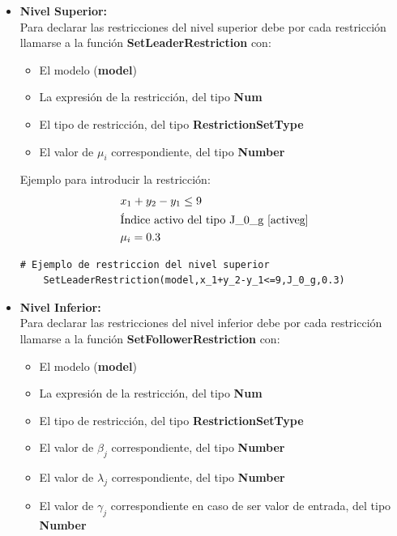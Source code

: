 \begin{itemize}
    \item \textbf{Nivel Superior:}\\

Para declarar las restricciones del nivel superior debe por cada restricción
llamarse a la función \textbf{SetLeaderRestriction} con:
\begin{itemize}
    \item El modelo (\textbf{model})
    \item La expresión de la restricción, del tipo \textbf{Num}
    \item El tipo de restricción, del tipo \textbf{RestrictionSetType}
    \item El valor de $\mu_i$ correspondiente, del tipo \textbf{Number} 
\end{itemize}

Ejemplo para introducir la restricción:
\begin{align*}
    &x_1+y_2-y_1 \leq 9 \\
    &\text{Índice activo del tipo J\_0\_g \ref{activeg}}\\
    & \mu_i=0.3
\end{align*}

\begin{lstlisting}[caption={Introducir restricción del nivel superior}]
    # Ejemplo de restriccion del nivel superior
    SetLeaderRestriction(model,x_1+y_2-y_1<=9,J_0_g,0.3)
\end{lstlisting}


\item \textbf{Nivel Inferior:}\\
Para declarar las restricciones del nivel inferior debe por cada restricción
llamarse a la función \textbf{SetFollowerRestriction} con:
\begin{itemize}
   \item El modelo (\textbf{model})
   \item La expresión de la restricción, del tipo \textbf{Num}
   \item El tipo de restricción, del tipo \textbf{RestrictionSetType}
   \item El valor de $\beta_j$ correspondiente, del tipo \textbf{Number}
   \item El valor de $\lambda_j$ correspondiente, del tipo \textbf{Number}
   \item El valor de $\gamma_j$ correspondiente en caso de ser valor de entrada, del tipo \textbf{Number}
\end{itemize}



\end{itemize}
